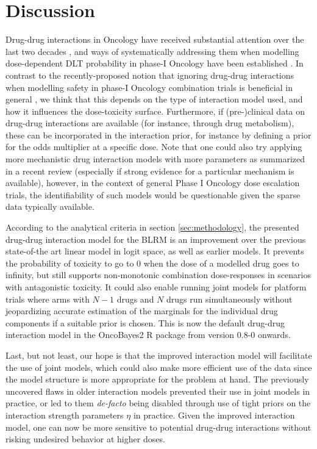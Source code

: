 \documentclass[AMA,STIX1COL]{WileyNJD-v2}
\begin{document}
\section{Discussion}\label{sec:discussion}
Drug-drug interactions in Oncology have received substantial attention over the last two decades \cite{Beijnen2004}, and ways of systematically addressing them when modelling dose-dependent DLT probability in phase-I Oncology have been established \cite{Thall2003}. In contrast to the recently-proposed notion that ignoring drug-drug interactions when modelling safety in phase-I Oncology combination trials is beneficial in general \cite{Mozgunov2021}, we think that this depends on the type of interaction model used, and how it influences the dose-toxicity surface. Furthermore, if (pre-)clinical data on drug-drug interactions are available (for instance, through drug metabolism), these can be incorporated in the interaction prior, for instance  by defining a prior for the odds multiplier at a specific dose. Note that one could also try applying more mechanistic drug interaction models with more parameters as summarized in a recent review\cite{Meyer2020} (especially if strong evidence for a particular mechanism is available), however, in the context of general Phase I Oncology dose escalation trials, the identifiability of such models would be questionable given the sparse data typically available.

According to the analytical criteria in section \ref{sec:methodology}, the presented drug-drug interaction model for the BLRM is an improvement over the previous state-of-the art linear model in logit space, as well as earlier models\citep{Thall2003}. It prevents the probability of toxicity to go to 0 when the dose of a modelled drug goes to infinity, but still supports non-monotonic combination dose-responses in scenarios with antagonistic toxicity. It could also enable running joint models for platform trials where arms with $N - 1$ drugs and $N$ drugs run simultaneously without jeopardizing accurate estimation of the marginals for the individual drug components if a suitable prior is chosen. This is now the default drug-drug interaction model in the OncoBayes2 R package from version 0.8-0 onwards.

Last, but not least, our hope is that the improved interaction model will facilitate the use of joint models, which could also make more efficient use of the data since the model structure is more appropriate for the problem at hand. The previously uncovered flaws in older interaction models prevented their use in joint models in practice, or led to them \emph{de-facto} being disabled through use of tight priors on the interaction strength parameters $\eta$ in practice. Given the improved interaction model, one can now be more sensitive to potential drug-drug interactions without risking undesired behavior at higher doses.
\end{document}
